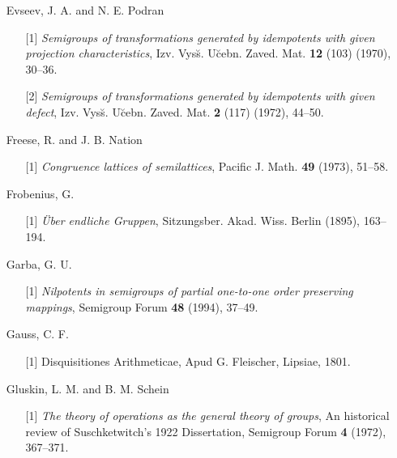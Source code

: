 \documentclass{surv-l}
\numberwithin{equation}{section}
\numberwithin{table}{section}
\numberwithin{figure}{section}
\theoremstyle{definition}
\begin{document}
\begin{enumerate}
\item[] Evseev, J. A. and N. E. Podran
\begin{enumerate}
\item[\hypertarget{bib15}{[1]}] \emph{Semigroups of transformations generated by
idempotents with given projection characteristics}, Izv.
Vys\u{s}. U\u{c}ebn. Zaved. Mat. \textbf{12} (103) (1970),
30--36.

\item[\hypertarget{bib15a}{[2]}] \emph{Semigroups of transformations generated by
idempotents with given defect}, Izv. Vys\u{s}. U\u{c}ebn.
Zaved. Mat. \textbf{2} (117) (1972), 44--50.
\end{enumerate}

\item[] Freese, R. and J. B. Nation
\begin{enumerate}
\item[\hypertarget{bib16}{[1]}] \emph{Congruence lattices of semilattices}, Pacific J.
Math. \textbf{49} (1973), 51--58.
\end{enumerate}

\item[] Frobenius, G.
\begin{enumerate}
\item[\hypertarget{bib17}{[1]}] \emph{\"{U}ber endliche Gruppen}, Sitzungsber. Akad. Wiss.
Berlin (1895), 163--194.
\end{enumerate}

\item[] Garba, G. U.
\begin{enumerate}
\item[\hypertarget{bib18}{[1]}] \emph{Nilpotents in semigroups of partial one-to-one
order preserving mappings}, Semigroup Forum \textbf{48}
(1994), 37--49.
\end{enumerate}

\item[] Gauss, C. F.
\begin{enumerate}
\item[\hypertarget{bib19}{[1]}] Disquisitiones Arithmeticae, Apud G. Fleischer, Lipsiae,
1801.
\end{enumerate}

\item[] Gluskin, L. M. and B. M. Schein
\begin{enumerate}
\item[\hypertarget{bib20}{[1]}] \emph{The theory of operations as the general theory
of groups}, An historical review of Suschketwitch's 1922
Dissertation, Semigroup Forum \textbf{4} (1972), 367--371.
\end{enumerate}


\end{enumerate}
\end{document}
